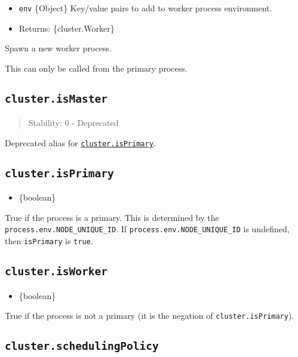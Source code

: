\begin{itemize}
\tightlist
\item
  \texttt{env} \{Object\} Key/value pairs to add to worker process
  environment.
\item
  Returns: \{cluster.Worker\}
\end{itemize}

Spawn a new worker process.

This can only be called from the primary process.

\subsection{\texorpdfstring{\texttt{cluster.isMaster}}{cluster.isMaster}}\label{cluster.ismaster}

\begin{quote}
Stability: 0 - Deprecated
\end{quote}

Deprecated alias for
\hyperref[clusterisprimary]{\texttt{cluster.isPrimary}}.

\subsection{\texorpdfstring{\texttt{cluster.isPrimary}}{cluster.isPrimary}}\label{cluster.isprimary}

\begin{itemize}
\tightlist
\item
  \{boolean\}
\end{itemize}

True if the process is a primary. This is determined by the
\texttt{process.env.NODE\_UNIQUE\_ID}. If
\texttt{process.env.NODE\_UNIQUE\_ID} is undefined, then
\texttt{isPrimary} is \texttt{true}.

\subsection{\texorpdfstring{\texttt{cluster.isWorker}}{cluster.isWorker}}\label{cluster.isworker}

\begin{itemize}
\tightlist
\item
  \{boolean\}
\end{itemize}

True if the process is not a primary (it is the negation of
\texttt{cluster.isPrimary}).

\subsection{\texorpdfstring{\texttt{cluster.schedulingPolicy}}{cluster.schedulingPolicy}}\label{cluster.schedulingpolicy}

